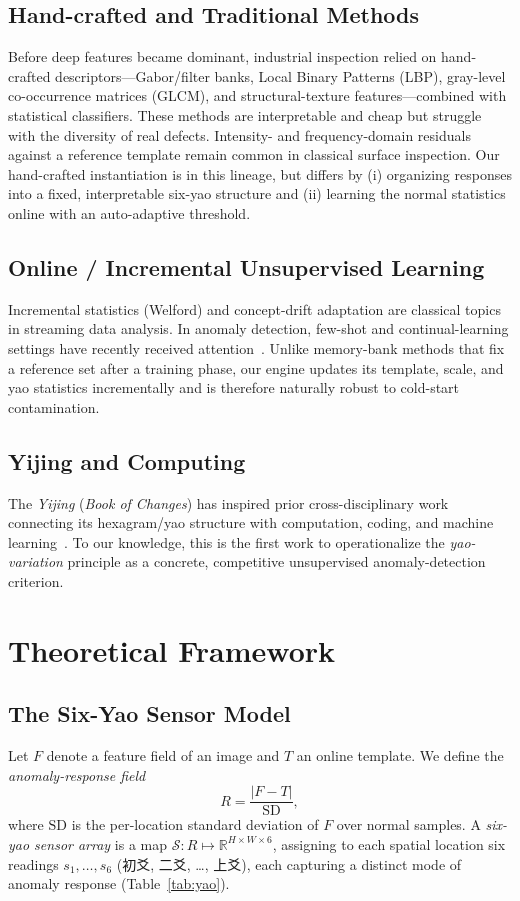 \documentclass[journal,10pt]{IEEEtran}
\begin{document}
\subsection{Hand-crafted and Traditional Methods}
Before deep features became dominant, industrial inspection relied on
hand-crafted descriptors---Gabor/filter banks, Local Binary Patterns
(LBP), gray-level co-occurrence matrices (GLCM), and structural-texture
features---combined with statistical classifiers. These methods are
interpretable and cheap but struggle with the diversity of real defects.
Intensity- and frequency-domain residuals against a reference template
remain common in classical surface inspection. Our hand-crafted
instantiation is in this lineage, but differs by (i) organizing responses
into a fixed, interpretable six-yao structure and (ii) learning the normal
statistics online with an auto-adaptive threshold.

\subsection{Online / Incremental Unsupervised Learning}
Incremental statistics (Welford) and concept-drift adaptation are
classical topics in streaming data analysis. In anomaly detection,
few-shot and continual-learning settings have recently received
attention~\cite{jeong2023winclip}. Unlike memory-bank methods that fix a reference
set after a training phase, our engine updates its template, scale, and
yao statistics incrementally and is therefore naturally robust to
cold-start contamination.

\subsection{Yijing and Computing}
The \emph{Yijing} (\emph{Book of Changes}) has inspired prior
cross-disciplinary work connecting its hexagram/yao structure with
computation, coding, and machine learning~\cite{zhang2020yijing}. To our knowledge,
this is the first work to operationalize the \emph{yao-variation}
principle as a concrete, competitive unsupervised anomaly-detection
criterion.

\section{Theoretical Framework}
\label{sec:framework}
\subsection{The Six-Yao Sensor Model}
Let $F$ denote a feature field of an image and $T$ an online template.
We define the \emph{anomaly-response field}
\begin{equation}
R = \frac{|F - T|}{\mathrm{SD}},
\end{equation}
where $\mathrm{SD}$ is the per-location standard deviation of $F$ over
normal samples. A \emph{six-yao sensor array} is a map
$\mathcal{S}: R \mapsto \mathbb{R}^{H\times W\times 6}$, assigning to each
spatial location six readings $s_1,\dots,s_6$ (初爻, 二爻, \dots, 上爻),
each capturing a distinct mode of anomaly response (Table~\ref{tab:yao}).
\end{document}
